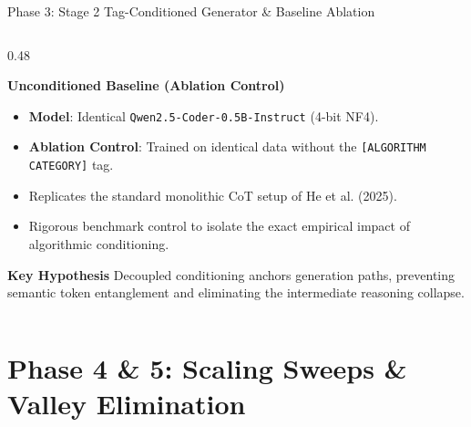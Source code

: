 \documentclass[aspectratio=169,10pt]{beamer}
\begin{document}
\begin{frame}{Phase 3: Stage 2 Tag-Conditioned Generator \& Baseline Ablation}
\begin{columns}[T]
    \begin{column}{0.48\textwidth}
      \begin{exampleblock}{\textbf{Unconditioned Baseline (Ablation Control)}}
        \begin{itemize}\itemsep=1.5pt\scriptsize
          \item \textbf{Model}: Identical \texttt{Qwen2.5-Coder-0.5B-Instruct} (4-bit NF4).
          \item \textbf{Ablation Control}: Trained on identical data without the \texttt{[ALGORITHM CATEGORY]} tag.
          \item Replicates the standard monolithic CoT setup of He et al. (2025).
          \item Rigorous benchmark control to isolate the exact empirical impact of algorithmic conditioning.
        \end{itemize}
      \end{exampleblock}
      \vspace{2pt}
      \begin{alertblock}{\textbf{Key Hypothesis}}
        \scriptsize
        Decoupled conditioning anchors generation paths, preventing semantic token entanglement and eliminating the intermediate reasoning collapse.
      \end{alertblock}
    \end{column}
  \end{columns}
\end{frame}

\section{Phase 4 \& 5: Scaling Sweeps \& Valley Elimination}
\end{document}

